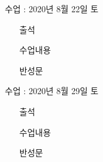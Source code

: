 \documentclass[aspectratio=1610,17pt,xcolor=pdftex,dvipsnames,table,handout]{beamer}
\begin{document}
		\begin{frame} [t,plain]
			\begin{block} {수업 : 2020년 8월 22일 토}

			\setlength{\leftmargini}{5em}			
			\begin{itemize}
				\item [출석] 
				\item [수업내용] 
				\item [반성문] 
			\end{itemize}
			\end{block}
		\end{frame}
		
		\begin{frame} [t,plain]
			\begin{block} {수업 : 2020년 8월 29일 토}

			\setlength{\leftmargini}{5em}			
			\begin{itemize}
				\item [출석] 
				\item [수업내용] 
				\item [반성문] 
			\end{itemize}
			\end{block}
		\end{frame}

\end{document}
